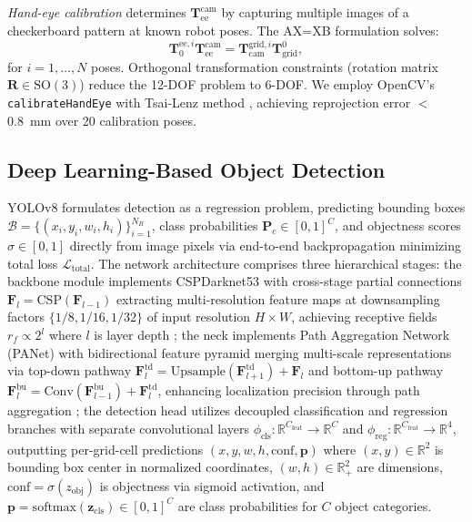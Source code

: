 \documentclass[journal]{IEEEtran}
\begin{document}
\textit{Hand-eye calibration} determines $\mathbf{T}_{\text{ee}}^{\text{cam}}$ by capturing multiple images of a checkerboard pattern at known robot poses. The AX=XB formulation \cite{tsai1989new} solves:
\begin{equation}
\mathbf{T}_{0}^{\text{ee},i} \mathbf{T}_{\text{ee}}^{\text{cam}} = \mathbf{T}_{\text{cam}}^{\text{grid},i} \mathbf{T}_{\text{grid}}^{0},
\label{eq:axb_formulation}
\end{equation}
for $i = 1, \ldots, N$ poses. Orthogonal transformation constraints (rotation matrix $\mathbf{R} \in \text{SO}(3)$) reduce the 12-DOF problem to 6-DOF. We employ OpenCV's \texttt{calibrateHandEye} with Tsai-Lenz method \cite{tsai1989new}, achieving reprojection error $<$0.8~mm over 20 calibration poses.

\subsection{Deep Learning-Based Object Detection}

YOLOv8 formulates detection as a regression problem, predicting bounding boxes $\mathcal{B} = \{(x_i, y_i, w_i, h_i)\}_{i=1}^{N_B}$, class probabilities $\mathbf{P}_c \in [0,1]^C$, and objectness scores $\sigma \in [0,1]$ directly from image pixels via end-to-end backpropagation minimizing total loss $\mathcal{L}_{\text{total}}$. The network architecture comprises three hierarchical stages: the backbone module implements CSPDarknet53 with cross-stage partial connections $\mathbf{F}_l = \text{CSP}(\mathbf{F}_{l-1})$ extracting multi-resolution feature maps at downsampling factors $\{1/8, 1/16, 1/32\}$ of input resolution $H \times W$, achieving receptive fields $r_f \propto 2^l$ where $l$ is layer depth \cite{wang2020cspnet}; the neck implements Path Aggregation Network (PANet) with bidirectional feature pyramid merging multi-scale representations via top-down pathway $\mathbf{F}_l^{\text{td}} = \text{Upsample}(\mathbf{F}_{l+1}^{\text{td}}) + \mathbf{F}_l$ and bottom-up pathway $\mathbf{F}_l^{\text{bu}} = \text{Conv}(\mathbf{F}_{l-1}^{\text{bu}}) + \mathbf{F}_l^{\text{td}}$, enhancing localization precision through path aggregation \cite{liu2018path}; the detection head utilizes decoupled classification and regression branches with separate convolutional layers $\phi_{\text{cls}}: \mathbb{R}^{C_{\text{feat}}} \rightarrow \mathbb{R}^C$ and $\phi_{\text{reg}}: \mathbb{R}^{C_{\text{feat}}} \rightarrow \mathbb{R}^4$, outputting per-grid-cell predictions $(x, y, w, h, \text{conf}, \boldsymbol{p})$ where $(x, y) \in \mathbb{R}^2$ is bounding box center in normalized coordinates, $(w, h) \in \mathbb{R}_{+}^2$ are dimensions, $\text{conf} = \sigma(z_{\text{obj}})$ is objectness via sigmoid activation, and $\boldsymbol{p} = \text{softmax}(\mathbf{z}_{\text{cls}}) \in [0,1]^C$ are class probabilities for $C$ object categories.
\end{document}
